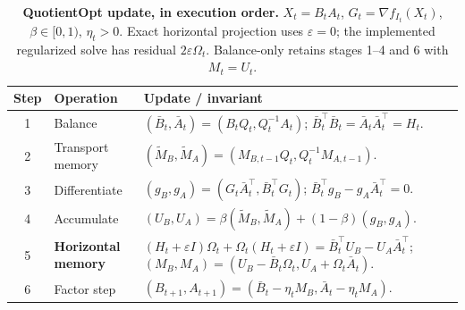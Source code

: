 \begin{table}[t]
\centering\small
\renewcommand{\arraystretch}{1.22}\setlength{\tabcolsep}{5pt}
\caption{\textbf{QuotientOpt update, in execution order.} $X_t=B_tA_t$, $G_t=\nabla f_{I_t}(X_t)$, $\beta\in[0,1)$, $\eta_t>0$. Exact horizontal projection uses $\varepsilon=0$; the implemented regularized solve has residual $2\varepsilon\Omega_t$. Balance-only retains stages 1--4 and 6 with $M_t=U_t$.}
\label{tab:method-update}
\begin{tabularx}{\linewidth}{@{}clX@{}}
\toprule
Step & Operation & Update / invariant \\
\midrule
1 & Balance & $(\bar B_t,\bar A_t)=(B_tQ_t,Q_t^{-1}A_t)$; $\bar B_t^\top\bar B_t=\bar A_t\bar A_t^\top=H_t$.\\
2 & Transport memory & $(\widetilde M_B,\widetilde M_A)=(M_{B,t-1}Q_t,Q_t^{-1}M_{A,t-1})$.\\
3 & Differentiate & $(g_B,g_A)=(G_t\bar A_t^\top,\bar B_t^\top G_t)$; $\bar B_t^\top g_B-g_A\bar A_t^\top=0$.\\
4 & Accumulate & $(U_B,U_A)=\beta(\widetilde M_B,\widetilde M_A)+(1-\beta)(g_B,g_A)$.\\
\rowcolor{oursbg}
5 & \textbf{Horizontal memory} & $(H_t+\varepsilon I)\Omega_t+\Omega_t(H_t+\varepsilon I)=\bar B_t^\top U_B-U_A\bar A_t^\top$;\newline $(M_B,M_A)=(U_B-\bar B_t\Omega_t,U_A+\Omega_t\bar A_t)$.\\
6 & Factor step & $(B_{t+1},A_{t+1})=(\bar B_t-\eta_tM_B,\bar A_t-\eta_tM_A)$.\\
\bottomrule
\end{tabularx}
\end{table}
